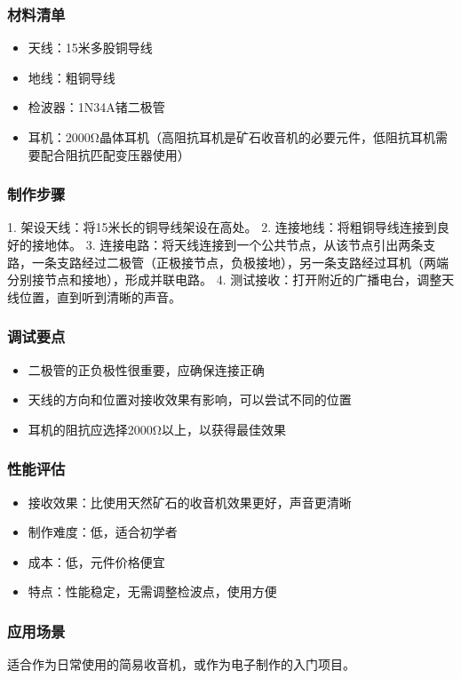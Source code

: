 \documentclass[12pt,UTF8]{ctexbook}
\begin{document}
\subsubsection{材料清单}
\begin{itemize}
  \item 天线：15米多股铜导线
  \item 地线：粗铜导线
  \item 检波器：1N34A锗二极管
  \item 耳机：2000Ω晶体耳机（高阻抗耳机是矿石收音机的必要元件，低阻抗耳机需要配合阻抗匹配变压器使用）
\end{itemize}

\subsubsection{制作步骤}
1. 架设天线：将15米长的铜导线架设在高处。
2. 连接地线：将粗铜导线连接到良好的接地体。
3. 连接电路：将天线连接到一个公共节点，从该节点引出两条支路，一条支路经过二极管（正极接节点，负极接地），另一条支路经过耳机（两端分别接节点和接地），形成并联电路。
4. 测试接收：打开附近的广播电台，调整天线位置，直到听到清晰的声音。

\subsubsection{调试要点}
\begin{itemize}
  \item 二极管的正负极性很重要，应确保连接正确
  \item 天线的方向和位置对接收效果有影响，可以尝试不同的位置
  \item 耳机的阻抗应选择2000Ω以上，以获得最佳效果
\end{itemize}

\subsubsection{性能评估}
\begin{itemize}
  \item 接收效果：比使用天然矿石的收音机效果更好，声音更清晰
  \item 制作难度：低，适合初学者
  \item 成本：低，元件价格便宜
  \item 特点：性能稳定，无需调整检波点，使用方便
\end{itemize}

\subsubsection{应用场景}
适合作为日常使用的简易收音机，或作为电子制作的入门项目。
\end{document}
